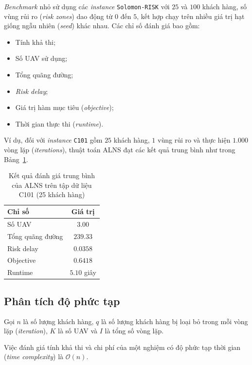\documentclass{article}
\begin{document}
\textit{Benchmark} nhỏ sử dụng các \textit{instance} \texttt{Solomon-RISK} với $25$ và $100$ khách hàng, số vùng rủi ro (\textit{risk zones}) dao động từ $0$ đến $5$, kết hợp chạy trên nhiều giá trị hạt giống ngẫu nhiên (\textit{seed}) khác nhau. Các chỉ số đánh giá bao gồm:
\begin{itemize}
    \item Tính khả thi;
    \item Số UAV sử dụng;
    \item Tổng quãng đường;
    \item \textit{Risk delay};
    \item Giá trị hàm mục tiêu (\textit{objective});
    \item Thời gian thực thi (\textit{runtime}).
\end{itemize}

Ví dụ, đối với \textit{instance} \texttt{C101} gồm $25$ khách hàng, $1$ vùng rủi ro và thực hiện $1.000$ vòng lặp (\textit{iterations}), thuật toán ALNS đạt các kết quả trung bình như trong Bảng~\ref{tab:benchmark_c101}.

\begin{table}[htbp]
    \centering
    \label{tab:benchmark_c101}
    \begin{tabular}{|l|c|}
        \hline
        \textbf{Chỉ số} & \textbf{Giá trị} \\ \hline
        Số UAV & $3.00$ \\ \hline
        Tổng quãng đường & $239.33$ \\ \hline
        Risk delay & $0.0358$ \\ \hline
        Objective & $0.6418$ \\ \hline
        Runtime & $5.10$ giây \\ \hline
    \end{tabular}
    \caption{Kết quả đánh giá trung bình của ALNS trên tập dữ liệu C101 (25 khách hàng)}
\end{table}
\subsection{Phân tích độ phức tạp}

Gọi $n$ là số lượng khách hàng, $q$ là số lượng khách hàng bị loại bỏ trong mỗi vòng lặp (\textit{iteration}), $K$ là số UAV và $I$ là tổng số vòng lặp.

Việc đánh giá tính khả thi và chi phí của một nghiệm có độ phức tạp thời gian (\textit{time complexity}) là $\mathcal{O}(n)$.
\end{document}
